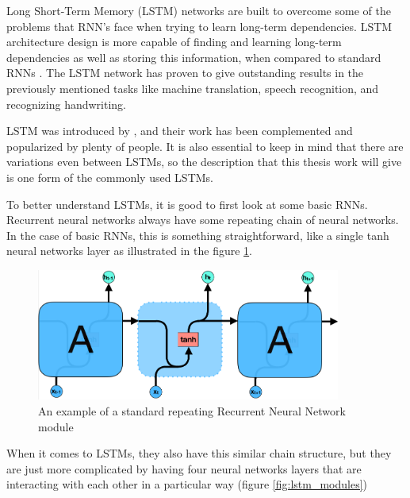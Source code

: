 Long Short-Term Memory (LSTM) networks are built to overcome some of the problems that RNN's face when trying to learn long-term dependencies. LSTM architecture design is more capable of finding and learning long-term dependencies as well as storing this information, when compared to standard RNNs \parencite{goodfellow2016deep,sak2014long,graves2013generating}. The LSTM network has proven to give outstanding results in the previously mentioned tasks like machine translation, speech recognition, and recognizing handwriting.

LSTM was introduced by \textcite{hochreiter1997long}, and their work has been complemented and popularized by plenty of people. It is also essential to keep in mind that there are variations even between LSTMs, so the description that this thesis work will give is one form of the commonly used LSTMs.

To better understand LSTMs, it is good to first look at some basic RNNs. Recurrent neural networks always have some repeating chain of neural networks. In the case of basic RNNs, this is something straightforward, like a single tanh neural networks layer as illustrated in the figure \ref{fig:rnn_module}.

\begin{figure}[h]
    \centering
    \includegraphics[width=10cm,height=\textheight,keepaspectratio]{rnn_module}
    \caption{An example of a standard repeating Recurrent Neural Network module}
    \label{fig:rnn_module}
\end{figure}

When it comes to LSTMs, they also have this similar chain structure, but they are just more complicated by having four neural networks layers that are interacting with each other in a particular way (figure \ref{fig:lstm_modules})

